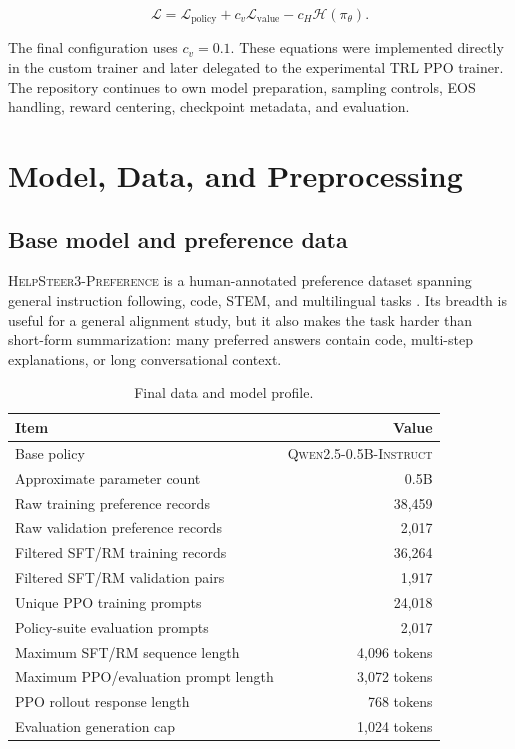 \documentclass[11pt]{article}
\newcommand{\model}{\textsc{Qwen2.5-0.5B-Instruct}}
\newcommand{\dataset}{\textsc{HelpSteer3-Preference}}
\newcommand{\trl}{\textsc{TRL}}
\begin{document}
\begin{equation}
\mathcal{L}
=
\mathcal{L}_{\mathrm{policy}}
+
c_v\mathcal{L}_{\mathrm{value}}
-
c_H\mathcal{H}(\pi_\theta).
\end{equation}

The final configuration uses $c_v=0.1$. These equations were implemented
directly in the custom trainer and later delegated to the experimental
\trl{} PPO trainer. The repository continues to own model preparation,
sampling controls, EOS handling, reward centering, checkpoint metadata, and
evaluation.

\section{Model, Data, and Preprocessing}

\subsection{Base model and preference data}

\dataset{} is a human-annotated preference dataset spanning general
instruction following, code, STEM, and multilingual tasks
\cite{wang2025}. Its breadth is useful for a general alignment study, but it
also makes the task harder than short-form summarization: many preferred
answers contain code, multi-step explanations, or long conversational context.

\begin{table}[H]
\centering
\caption{Final data and model profile.}
\label{tab:data-profile}
\begin{tabularx}{0.88\textwidth}{@{}Y r@{}}
\toprule
\textbf{Item} & \textbf{Value}\\
\midrule
Base policy & \model{}\\
Approximate parameter count & 0.5B\\
Raw training preference records & 38,459\\
Raw validation preference records & 2,017\\
Filtered SFT/RM training records & 36,264\\
Filtered SFT/RM validation pairs & 1,917\\
Unique PPO training prompts & 24,018\\
Policy-suite evaluation prompts & 2,017\\
Maximum SFT/RM sequence length & 4,096 tokens\\
Maximum PPO/evaluation prompt length & 3,072 tokens\\
PPO rollout response length & 768 tokens\\
Evaluation generation cap & 1,024 tokens\\
\bottomrule
\end{tabularx}
\end{table}
\end{document}
